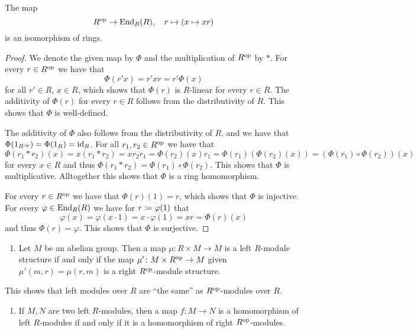 \begin{lemma}
  \label{lemma: End_R(R) = Rop}
  The map
  \[
              R^{\mathrm{op}}
    \to       \operatorname{End}_R(R),
    \quad     r
    \mapsto   (x \mapsto xr)
  \]
  is an isomorphism of rings.
\end{lemma}


\begin{proof}
  We denote the given map by $\Phi$ and the multiplication of $R^{\mathrm{op}}$ by $*$.
  For every $r \in R^{\mathrm{op}}$ we have that
  \[
      \Phi(r'x)
    = r' x r
    = r' \Phi(x)
  \]
  for all $r' \in R$, $x \in R$, which shows that $\Phi(r)$ is $R$-linear for every $r \in R$.
  The additivity of $\Phi(r)$ for every $r \in R$ follows from the distributivity of $R$.
  This shows that $\Phi$ is well-defined.
  
  The additivity of $\Phi$ also follows from the distributivity of $R$, and we have that $\Phi(1_{R^{\mathrm{op}}}) = \Phi(1_R) = \operatorname{id}_R$.
  For all $r_1, r_2 \in R^{\mathrm{op}}$ we have that
  \[
      \Phi(r_1 * r_2)(x)
    = x (r_1 * r_2)
    = x r_2 r_1
    = \Phi(r_2)(x) r_1
    = \Phi(r_1)(\Phi(r_2)(x))
    = (\Phi(r_1) \circ \Phi(r_2))(x)
  \]
  for every $x \in R$ and thus $\Phi(r_1 * r_2) = \Phi(r_1) \circ \Phi(r_2)$.
  This shows that $\Phi$ is multiplicative.
  Alltogether this shows that $\Phi$ is a ring homomorphism.
  
  For every $r \in R^{\mathrm{op}}$ we have that $\Phi(r)(1) = r$, which shows that $\Phi$ is injective.
  For every $\varphi \in \operatorname{End}_R(R)$ we have for $r \coloneqq \varphi(1)$ that
  \[
      \varphi(x)
    = \varphi(x \cdot 1)
    = x \cdot \varphi(1)
    = x r
    = \Phi(r)(x)
  \]
  and thus $\Phi(r) = \varphi$.
  This shows that $\Phi$ is surjective.
\end{proof}


\begin{proposition}
  \label{proposition: left right modules under op}
  \leavevmode
  \begin{enumerate}
    \item
      Let $M$ be an abelian group.
      Then a map $\mu \colon R \times M \to M$ is a left $R$-module structure if and only if the map $\mu' \colon  M \times R^{\mathrm{op}} \to M$ given $\mu'(m,r) = \mu(r,m)$ is a right $R^{\mathrm{op}}$-module structure.
  \end{enumerate}
  This shows that left modules over $R$ are \enquote{the same} as $R^{\mathrm{op}}$-modules over $R$.
  \begin{enumerate}[resume]
    \item
      If $M, N$ are two left $R$-modules, then a map $f \colon M \to N$ is a homomorphism of left $R$-modules if and only if it is a homomorphism of right $R^{\mathrm{op}}$-modules.
  \end{enumerate}
\end{proposition}


